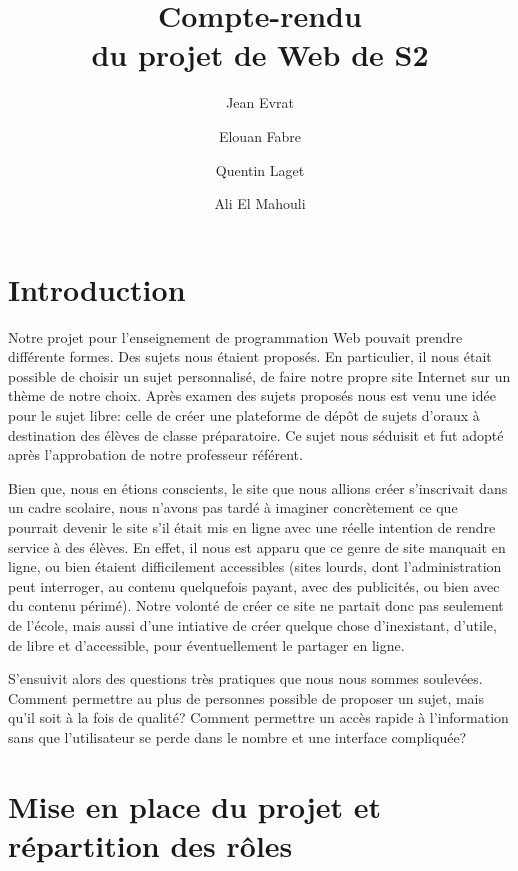 \documentclass{article}
\title{Compte-rendu \\ \smallskip \large du projet de Web de S2}
\author{Jean Evrat \and Elouan Fabre \and Quentin Laget \and Ali El Mahouli}
\begin{document}
\maketitle

\section*{Introduction}

Notre projet pour l'enseignement de programmation Web pouvait prendre différente formes. Des sujets nous étaient proposés. En particulier, il nous était possible de choisir un sujet personnalisé, de faire notre propre site Internet sur un thème de notre choix. Après examen des sujets proposés nous est venu une idée pour le sujet libre: celle de créer une plateforme de dépôt de sujets d'oraux à destination des élèves de classe préparatoire. Ce sujet nous séduisit et fut adopté après l'approbation de notre professeur référent.

Bien que, nous en étions conscients, le site que nous allions créer s'inscrivait dans un cadre scolaire, nous n'avons pas tardé à imaginer concrètement ce que pourrait devenir le site s'il était mis en ligne avec une réelle intention de rendre service à des élèves. En effet, il nous est apparu que ce genre de site manquait en ligne, ou bien étaient difficilement accessibles (sites lourds, dont l'administration peut interroger, au contenu quelquefois payant, avec des publicités, ou bien avec du contenu périmé). Notre volonté de créer ce site ne partait donc pas seulement de l'école, mais aussi d'une intiative de créer quelque chose d'inexistant, d'utile, de libre et d'accessible, pour éventuellement le partager en ligne.

S'ensuivit alors des questions très pratiques que nous nous sommes soulevées. Comment permettre au plus de personnes possible de proposer un sujet, mais qu’il soit à la fois de qualité? Comment permettre un accès rapide à l'information sans que l'utilisateur se perde dans le nombre et une interface compliquée?


\section*{Mise en place du projet et répartition des rôles}
\end{document}
